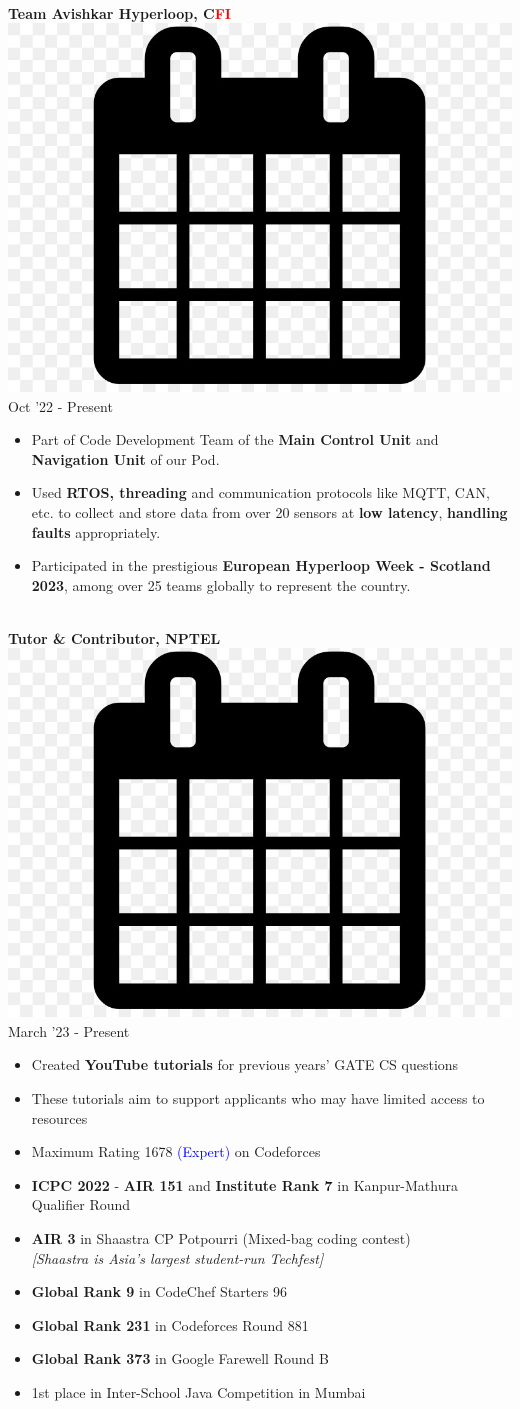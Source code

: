 \documentclass[10pt,article]{article}
\newcommand{\myMargin}{0.2in}
\newcommand{\resheading}[1]{{\small \colorbox{myblue} { \begin{minipage}{\dimexpr\linewidth-2\fboxsep}\centering{\textbf{#1 \vphantom{p\^{E}}}}\end{minipage}}}}
\newcommand{\myfont}[2]{\fontsize{#1}{#1}\selectfont #2}
\newcommand{\subheadingfont}[1]{\myfont{11pt}{#1}}
\newcommand{\projecttopic}[1]{\myfont{11pt}{\textbf{#1}}}
\newcommand{\mycal}[1]{\includegraphics[scale=0.018]{calendar.png} \myfont{10}{#1}}
\begin{document}
\begin{multicols*}{2}
\noindent
\hrulefill \\ [-0.5cm]
\projecttopic{Team Avishkar Hyperloop, C\textcolor{red}{FI}} \hfill \mycal{Oct '22 - Present} 
\begin{itemize}[leftmargin=\myMargin]
    \item Part of Code Development Team of the \textbf{Main Control Unit} and \textbf{Navigation Unit} of our Pod. 
    \item Used \textbf{RTOS, threading} and communication protocols like MQTT, CAN, etc. to collect and store data from over 20 sensors at \textbf{low latency}, \textbf{handling faults} appropriately.
    \item Participated in the prestigious \textbf{European Hyperloop Week - Scotland 2023}, 
    among over 25 teams globally to represent the country.
\end{itemize}
\vspace{3pt}
\noindent
\hrulefill \\ [-0.5cm]
\projecttopic{Tutor \& Contributor, \textcolor{nptel}{NPTEL}} \hfill \mycal{March '23 - Present}
\begin{itemize}[leftmargin=\myMargin]
    \item Created \textbf{YouTube tutorials} for previous years' GATE CS questions
    \item These tutorials aim to support applicants who may have limited access to resources
\end{itemize}


\noindent
\resheading{\subheadingfont{CODING ACHIEVEMENTS}}
 \begin{itemize}[ leftmargin=\myMargin]
    \setlength \itemsep{-0.1em}
  \item Maximum Rating 1678 \textcolor{blue}{(Expert)} on Codeforces
  \item \textbf{ICPC 2022} - \textbf{AIR 151} and \textbf{Institute Rank 7} in Kanpur-Mathura Qualifier Round
\item \textbf{AIR 3} in Shaastra CP Potpourri (Mixed-bag coding contest) \\ \small {\textit{[Shaastra is Asia's largest student-run Techfest]}} 
    \item \normalsize{ \textbf{Global Rank 9} in CodeChef Starters 96} 
    \item \normalsize{ \textbf{Global Rank 231} in Codeforces Round 881} 
    \item \normalsize{ \textbf{Global Rank 373} in Google Farewell Round B} 
    \item  \normalsize {1st place in Inter-School Java Competition in Mumbai}
  \end{itemize}


\end{multicols*}
\end{document}
